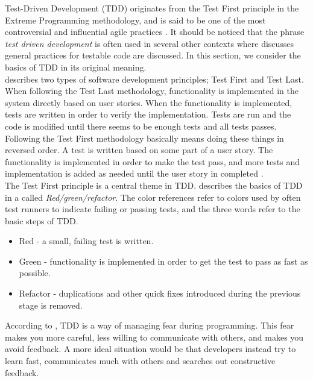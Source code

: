 Test-Driven Development (TDD) originates from the Test First principle
in the Extreme Programming methodology, and is said to be one of the
most controversial and influential agile practices
\cite{book:tdd_madeyski}. It should be noticed that the phrase
\emph{test driven development} is often used in several other contexts
where discusses general practices for testable code are discussed. In
this section, we consider the basics of TDD in its original meaning.\\

\citet{book:tdd_madeyski} describes two types of software development
principles; Test First and Test Last. When following the Test Last
methodology, functionality is implemented in the system directly based
on user stories. When the functionality is implemented, tests are
written in order to verify the implementation. Tests are run and the
code is modified until there seems to be enough tests and all tests
passes.\\

Following the Test First methodology basically means doing these things
in reversed order. A test is written based on some part of a user story.
The functionality is implemented in order to make the test pass, and
more tests and implementation is added as needed until the user story in
completed \cite{book:tdd_madeyski}.\\

The Test First principle is a central theme in TDD.
\citet{book:tdd_beck} describes the basics of TDD in a 
called \emph{Red/green/refactor}. The color references refer to colors
used by often test runners to indicate failing or passing tests, and the
three words refer to the basic steps of TDD.

\begin{itemize}
    \item Red - a small, failing test is written.
    \item Green - functionality is implemented in order to get the test
          to pass as fast as possible.
    \item Refactor - duplications and other quick fixes introduced
          during the previous stage is removed.
\end{itemize}

According to \citeauthor{book:tdd_beck}, TDD is a way of managing fear
during programming. This fear makes you more careful, less willing to
communicate with others, and makes you avoid feedback. A more ideal
situation would be that developers instead try to learn fast,
communicates much with others and searches out constructive feedback.\\

